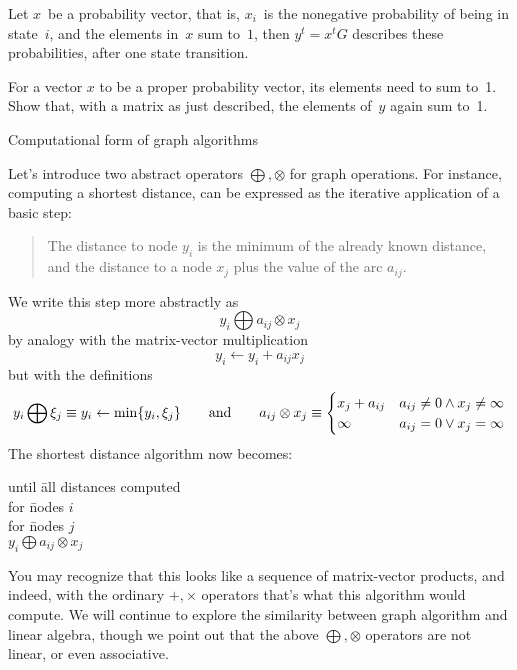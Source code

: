 Let $x$~be a probability vector, that is,
$x_i$~is the nonegative probability 
of being in state~$i$, and the elements in~$x$ sum to~$1$,
then $y^t=x^tG$ describes these probabilities,
after one state transition.

\begin{exercise}
For a vector $x$ to be a proper probability vector, its elements
need to sum to~1.
Show that, with a matrix as just described,
the elements of~$y$ again sum to~1.
\end{exercise}

 {Computational form of graph algorithms}
\label{app:graph-mult}

Let's introduce two abstract operators $\bigoplus,\otimes$
for graph operations.
For instance, computing a shortest distance, can be expressed
as the iterative application of a basic step:
\begin{quote}
  The distance to node $y_i$ is the minimum of the already known distance,
  and the distance to a node $x_j$ plus the value of the arc $a_{ij}$.
\end{quote}
We write this step more abstractly as
\[ y_i \bigoplus a_{ij}\otimes x_j \]
by analogy with the matrix-vector multiplication
\[ y_i \leftarrow y_i + a_{ij}x_j \]
but with the definitions
\[ y_i\bigoplus \xi_j \equiv y_i\leftarrow \min\{y_i,\xi_j\} 
\qquad\hbox{and}\qquad
a_{ij}\otimes x_j \equiv
\begin{cases}
  x_j+a_{ij}&a_{ij}\not=0 \wedge x_j\not=\infty\\
  \infty    &a_{ij}=0 \vee x_j=\infty\\
\end{cases}
\]
The shortest distance algorithm now becomes:

\begin{tabbing}
until \=all distances computed\\
\> for \=nodes $i$\\
\>\> for \=nodes $j$\\
\>\>\> $y_i \bigoplus a_{ij}\otimes x_j$\\
\end{tabbing}

You may recognize that this looks like a sequence of matrix-vector
products, and indeed, with the ordinary $+,\times$ operators
that's what this algorithm would compute.
We will continue to explore the similarity between graph algorithm
and linear algebra, though we point out that the above $\bigoplus,\otimes$
operators are not linear, or even associative.

